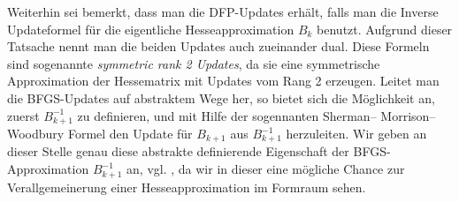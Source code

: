 Weiterhin sei bemerkt, dass man die DFP-Updates erhält, falls man die Inverse Updateformel für die eigentliche Hesseapproximation $B_k$ benutzt. Aufgrund dieser Tatsache nennt man die beiden Updates auch zueinander dual.
Diese Formeln sind sogenannte \textit{symmetric rank 2 Updates}, da sie eine symmetrische Approximation der Hessematrix mit Updates vom Rang 2 erzeugen. Leitet man die BFGS-Updates auf abstraktem Wege her, so bietet sich die Möglichkeit an, zuerst $B_{k+1}^{-1}$ zu definieren, und mit Hilfe der sogennanten Sherman–
Morrison–Woodbury Formel den Update für $B_{k+1}$ aus $B_{k+1}^{-1}$ herzuleiten. Wir geben an dieser Stelle genau diese abstrakte definierende Eigenschaft der BFGS-Approximation $B_{k+1}^{-1}$ an, vgl. \cite{Nocedal}, da wir in dieser eine mögliche Chance zur Verallgemeinerung einer Hesseapproximation im Formraum sehen.

